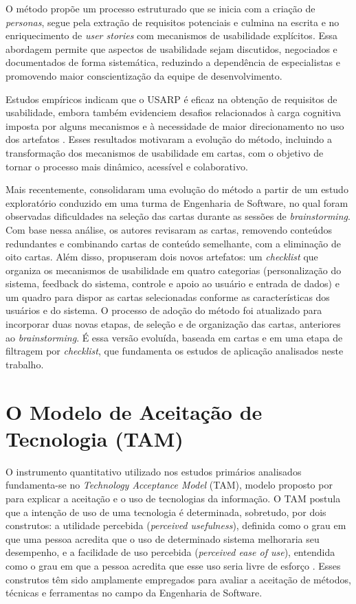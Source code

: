 \FloatBarrier

O método propõe um processo estruturado que se inicia com a criação de \textit{personas}, segue pela extração de requisitos potenciais e culmina na escrita e no enriquecimento de \textit{user stories} com mecanismos de usabilidade explícitos. Essa abordagem permite que aspectos de usabilidade sejam discutidos, negociados e documentados de forma sistemática, reduzindo a dependência de especialistas e promovendo maior conscientização da equipe de desenvolvimento.

Estudos empíricos indicam que o USARP é eficaz na obtenção de requisitos de usabilidade, embora também evidenciem desafios relacionados à carga cognitiva imposta por alguns mecanismos e à necessidade de maior direcionamento no uso dos artefatos \cite{marques2022}. Esses resultados motivaram a evolução do método, incluindo a transformação dos mecanismos de usabilidade em cartas, com o objetivo de tornar o processo mais dinâmico, acessível e colaborativo.

Mais recentemente,  consolidaram uma evolução do método a partir de um estudo exploratório conduzido em uma turma de Engenharia de Software, no qual foram observadas dificuldades na seleção das cartas durante as sessões de \textit{brainstorming}. Com base nessa análise, os autores revisaram as cartas, removendo conteúdos redundantes e combinando cartas de conteúdo semelhante, com a eliminação de oito cartas. Além disso, propuseram dois novos artefatos: um \textit{checklist} que organiza os mecanismos de usabilidade em quatro categorias (personalização do sistema, feedback do sistema, controle e apoio ao usuário e entrada de dados) e um quadro para dispor as cartas selecionadas conforme as características dos usuários e do sistema. O processo de adoção do método foi atualizado para incorporar duas novas etapas, de seleção e de organização das cartas, anteriores ao \textit{brainstorming}. É essa versão evoluída, baseada em cartas e em uma etapa de filtragem por \textit{checklist}, que fundamenta os estudos de aplicação analisados neste trabalho.

\section{O Modelo de Aceitação de Tecnologia (TAM)}

O instrumento quantitativo utilizado nos estudos primários analisados fundamenta-se no \textit{Technology Acceptance Model} (TAM), modelo proposto por  para explicar a aceitação e o uso de tecnologias da informação. O TAM postula que a intenção de uso de uma tecnologia é determinada, sobretudo, por dois construtos: a utilidade percebida (\textit{perceived usefulness}), definida como o grau em que uma pessoa acredita que o uso de determinado sistema melhoraria seu desempenho, e a facilidade de uso percebida (\textit{perceived ease of use}), entendida como o grau em que a pessoa acredita que esse uso seria livre de esforço \cite{davis1989}. Esses construtos têm sido amplamente empregados para avaliar a aceitação de métodos, técnicas e ferramentas no campo da Engenharia de Software.

